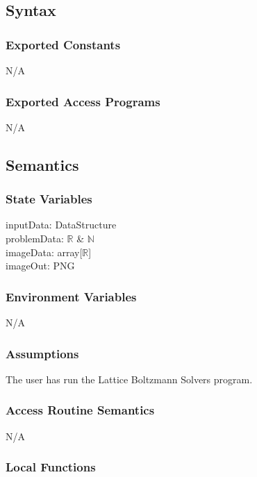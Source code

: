 \documentclass[12pt, titlepage]{article}
\newcommand{\famname}{Lattice Boltzmann Solvers}
\begin{document}
\subsection{Syntax}

\subsubsection{Exported Constants}
N/A

\subsubsection{Exported Access Programs}
N/A

\subsection{Semantics}

\subsubsection{State Variables}
inputData: DataStructure\\
problemData: $\mathbb{R}$ \& $\mathbb{N}$ \\ 
imageData: array[$\mathbb{R}$]\\
imageOut: PNG\\


\subsubsection{Environment Variables}

N/A

\subsubsection{Assumptions}

The user has run the {\famname} program.  

\subsubsection{Access Routine Semantics}

N/A

\subsubsection{Local Functions}
\end{document}
